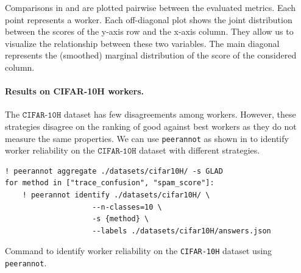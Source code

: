 Comparisons in  and  are plotted pairwise between the evaluated metrics.
Each point represents a worker.
Each off-diagonal plot shows the joint distribution between the scores of the y-axis row and the x-axis column.
They allow us to visualize the relationship between these two variables.
The main diagonal represents the (smoothed) marginal distribution of the score of the considered column.

\paragraph{Results on CIFAR-10H workers.}

The $\texttt{CIFAR-10H}$ dataset has few disagreements among workers.
However, these strategies disagree on the ranking of good against best workers as they do not measure the same properties.
We can use \texttt{peerannot} as shown in  to identify worker reliability on the $\texttt{CIFAR-10H}$ dataset with different strategies.

\begin{listing}[H]
    \begin{verbatim}
! peerannot aggregate ./datasets/cifar10H/ -s GLAD
for method in ["trace_confusion", "spam_score"]:
    ! peerannot identify ./datasets/cifar10H/ \
                    --n-classes=10 \
                    -s {method} \
                    --labels ./datasets/cifar10H/answers.json
\end{verbatim}
\caption{Command to identify worker reliability on the \texttt{CIFAR-10H} dataset using \texttt{peerannot}.}
\label{lst:peeranot_identify_c10h_workers}
\end{listing}

